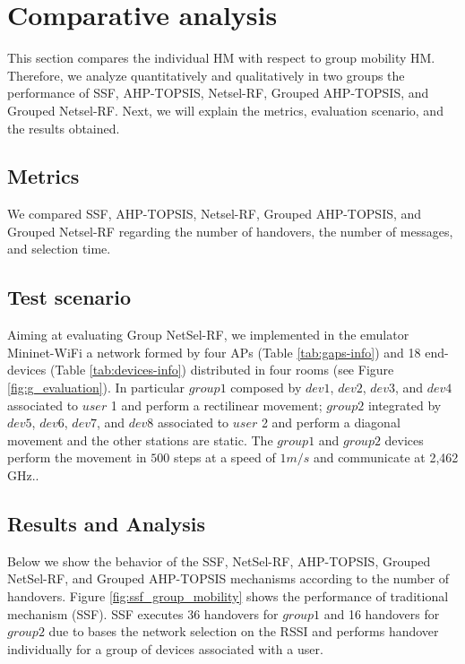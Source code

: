 \section{Comparative analysis}
\label{sec:comparative_analysis}

This section compares the individual HM with respect to group mobility  HM. Therefore,  we analyze quantitatively and qualitatively in two groups the performance of SSF, AHP-TOPSIS, Netsel-RF, Grouped AHP-TOPSIS, and Grouped Netsel-RF. Next, we will explain the metrics,  evaluation scenario, and the results obtained.



\subsection{Metrics}
\label{subsec:gb-metrics}

We compared SSF, AHP-TOPSIS, Netsel-RF, Grouped AHP-TOPSIS, and Grouped Netsel-RF regarding the number of handovers, the number of messages, and selection time.



\subsection{Test scenario}
\label{subsec:gb-test-scenario}

Aiming at evaluating Group NetSel-RF,  we implemented in the emulator Mininet-WiFi a network formed by four APs (Table \ref{tab:gaps-info}) and 18 end-devices  (Table \ref{tab:devices-info}) distributed in four rooms (see Figure \ref{fig:g_evaluation}). In particular $group1$ composed by  $dev1$, $dev2$, $dev3$, and $dev4$ associated to $user$ 1 and perform a rectilinear movement; $group2$ integrated by $dev5$, $dev6$, $dev7$, and $dev8$ associated to $user$ 2 and perform a diagonal movement and the other stations are static. The $group1$  and $group2$  devices perform the movement in $500$ steps at a speed of $1 m/s$ and communicate at 2,462 GHz.. 




\subsection{Results and Analysis}
\label{subsec:gb_resultsandanalisys}


Below we show the behavior of the SSF,  NetSel-RF, AHP-TOPSIS, Grouped NetSel-RF, and Grouped AHP-TOPSIS mechanisms according to the number of handovers. Figure \ref{fig:ssf_group_mobility} shows the performance of traditional mechanism (SSF). SSF executes 36 handovers for $group1$ and 16 handovers for $group2$ due to bases the network selection on the RSSI and performs handover individually for a group of devices associated with a user.


